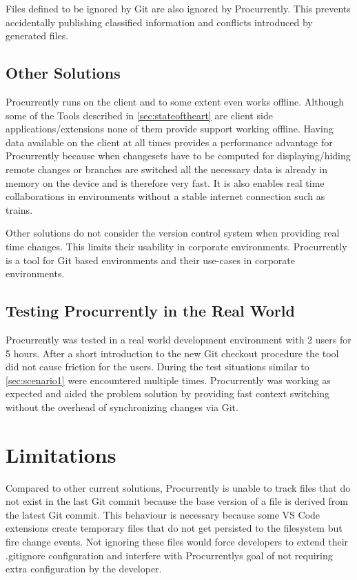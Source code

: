 Files defined to be ignored by Git are also ignored by Procurrently. This prevents accidentally publishing classified information and conflicts introduced by generated files. 

\subsection{Other Solutions}
Procurrently runs on the client and to some extent even works offline. Although some of the Tools described in \autoref{sec:stateoftheart} are client side applications/extensions none of them provide support working offline. Having data available on the client at all times provides a performance advantage for Procurrently because when changesets have to be computed for displaying/hiding remote changes or branches are switched all the necessary data is already in memory on the device and is therefore very fast. It is also enables real time collaborations in environments without a stable internet connection such as trains.

Other solutions do not consider the version control system when providing real time changes. This limits their usability in corporate environments. Procurrently is a tool for Git based environments and their use-cases in corporate environments. 

\subsection{Testing Procurrently in the Real World}

Procurrently was tested in a real world development environment with 2 users for 5 hours. After a short introduction to the new Git checkout procedure the tool did not cause friction for the users. During the test situations similar to \autoref{sec:scenario1} were encountered multiple times. Procurrently was working as expected and aided the problem solution by providing fast context switching without the overhead of synchronizing changes via Git.

\section{Limitations}

Compared to other current solutions, Procurrently is unable to track files that do not exist in the last Git commit because the base version of a file is derived from the latest Git commit. This behaviour is necessary because some VS Code extensions create temporary files that do not get persisted to the filesystem but fire change events. Not ignoring these files would force developers to extend their .gitignore configuration and interfere with Procurrentlys goal of not requiring extra configuration by the developer.

